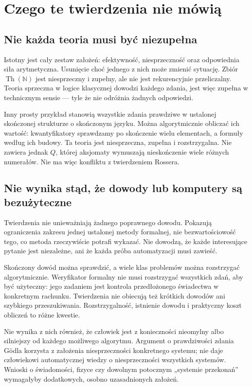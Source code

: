 \section{Czego te twierdzenia nie mówią}\label{sec:czego-nie-mowia}
\subsection*{Nie każda teoria musi być niezupełna}\label{sec:19:1}
Istotny jest cały zestaw założeń: efektywność, niesprzeczność oraz odpowiednia siła arytmetyczna. Usunięcie choć jednego z nich może zmienić sytuację. Zbiór $\operatorname{Th}(\mathbb N)$ jest niesprzeczny i zupełny, ale nie jest rekurencyjnie przeliczalny. Teoria sprzeczna w logice klasycznej dowodzi każdego zdania, jest więc zupełna w technicznym sensie --- tyle że nie odróżnia żadnych odpowiedzi.

Inny prosty przykład stanowią wszystkie zdania prawdziwe w ustalonej skończonej strukturze o skończonym języku. Można algorytmicznie obliczać ich wartość: kwantyfikatory sprawdzamy po skończenie wielu elementach, a formuły według ich budowy. Ta teoria jest niesprzeczna, zupełna i rozstrzygalna. Nie zawiera jednak $Q$, której aksjomaty wymuszają nieskończenie wiele różnych numerałów. Nie ma więc konfliktu z twierdzeniem Rossera.

\subsection*{Nie wynika stąd, że dowody lub komputery są bezużyteczne}\label{sec:19:2}
Twierdzenia nie unieważniają żadnego poprawnego dowodu. Pokazują ograniczenia zakresu jednej ustalonej metody formalnej, nie bezwartościowość tego, co metoda rzeczywiście potrafi wykazać. Nie dowodzą, że każde interesujące pytanie jest niezależne, ani że każda próba automatyzacji musi zawieść.

Skończony dowód można sprawdzić, a wiele klas problemów można rozstrzygać algorytmicznie. Weryfikator formalny nie musi rozstrzygać wszystkich zdań, aby być użyteczny: jego zadaniem jest kontrola przedłożonego świadectwa w konkretnym rachunku. Twierdzenia nie obiecują też krótkich dowodów ani szybkiego przeszukiwania. Rozstrzygalność, istnienie dowodu i praktyczny koszt obliczeń to różne kwestie.

Nie wynika z nich również, że człowiek jest z konieczności nieomylny albo silniejszy od każdego możliwego algorytmu. Argument o prawdziwości zdania Gödla korzysta z założenia niesprzeczności konkretnego systemu; nie daje człowiekowi automatycznej wiedzy o niesprzeczności wszystkich systemów. Wnioski o świadomości, fizyce czy dowolnym potocznym „systemie przekonań” wymagałyby dodatkowych, osobno uzasadnionych założeń.

